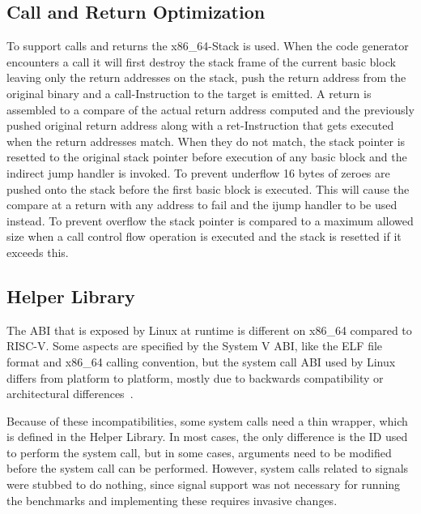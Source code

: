 \documentclass[course=eragp]{aspdoc}
\begin{document}
\subsection{Call and Return Optimization}
To support calls and returns the x86\_64-Stack is used. When the code generator encounters a call it will first destroy the stack frame of the current basic block leaving only the return addresses on the stack,
push the return address from the original binary and a call-Instruction to the target is emitted.
A return is assembled to a compare of the actual return address computed and the previously pushed original return address
along with a ret-Instruction that gets executed when the return addresses match.
When they do not match, the stack pointer is resetted to the original stack pointer before execution of any basic block and the indirect jump handler is invoked.
To prevent underflow 16 bytes of zeroes are pushed onto the stack before the first basic block is executed. This will cause the compare at a return with any address to fail and the ijump handler to be used instead.
To prevent overflow the stack pointer is compared to a maximum allowed size when a call control flow operation is executed and the stack is resetted if it exceeds this.

\subsection{Helper Library}\label{helper}

The ABI that is exposed by Linux at runtime is different on x86\_64 compared to RISC-V. Some aspects are specified by
the System V ABI, like the ELF file format and x86\_64 calling convention, but the system call ABI used by Linux differs
from platform to platform, mostly due to backwards compatibility or architectural differences~\cite{man_syscalls}.

Because of these incompatibilities, some system calls need a thin wrapper, which is defined in the Helper Library. In
most cases, the only difference is the ID used to perform the system call, but in some cases, arguments need to be
modified before the system call can be performed.
However, system calls related to signals were stubbed to do nothing, since signal support was not necessary for running
the benchmarks and implementing these requires invasive changes.
\end{document}
